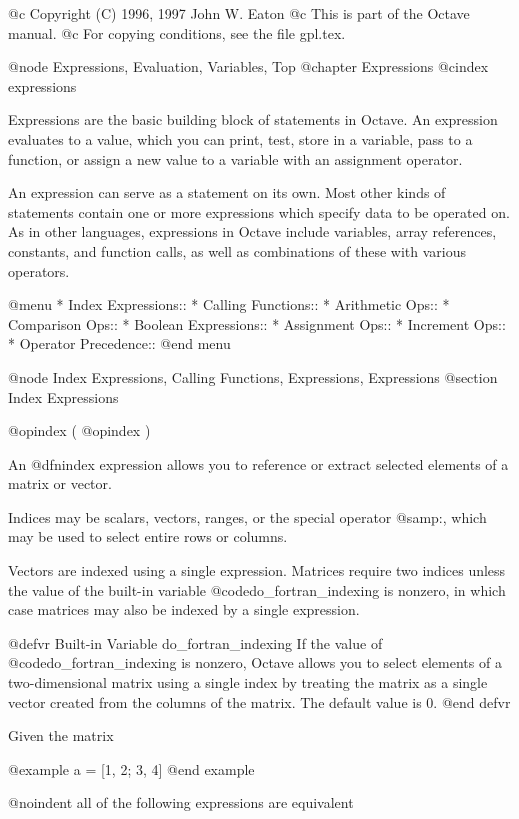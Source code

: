 @c Copyright (C) 1996, 1997 John W. Eaton
@c This is part of the Octave manual.
@c For copying conditions, see the file gpl.tex.

@node Expressions, Evaluation, Variables, Top
@chapter Expressions
@cindex expressions

Expressions are the basic building block of statements in Octave.  An
expression evaluates to a value, which you can print, test, store in a
variable, pass to a function, or assign a new value to a variable with
an assignment operator.

An expression can serve as a statement on its own.  Most other kinds of
statements contain one or more expressions which specify data to be
operated on.  As in other languages, expressions in Octave include
variables, array references, constants, and function calls, as well as
combinations of these with various operators.

@menu
* Index Expressions::           
* Calling Functions::           
* Arithmetic Ops::              
* Comparison Ops::              
* Boolean Expressions::         
* Assignment Ops::              
* Increment Ops::               
* Operator Precedence::         
@end menu

@node Index Expressions, Calling Functions, Expressions, Expressions
@section Index Expressions

@opindex (
@opindex )

An @dfn{index expression} allows you to reference or extract selected
elements of a matrix or vector.

Indices may be scalars, vectors, ranges, or the special operator
@samp{:}, which may be used to select entire rows or columns.

Vectors are indexed using a single expression.  Matrices require two
indices unless the value of the built-in variable
@code{do_fortran_indexing} is nonzero, in which case matrices may
also be indexed by a single expression.

@defvr {Built-in Variable} do_fortran_indexing
If the value of @code{do_fortran_indexing} is nonzero, Octave allows 
you to select elements of a two-dimensional matrix using a single index
by treating the matrix as a single vector created from the columns of
the matrix.  The default value is 0. 
@end defvr

Given the matrix

@example
a = [1, 2; 3, 4]
@end example

@noindent
all of the following expressions are equivalent

